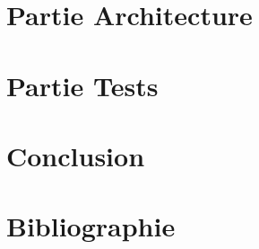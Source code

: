 \documentclass{article}
\begin{document}
\section{Partie Architecture}

\section{Partie Tests}

\section{Conclusion}

\section{Bibliographie}



\end{document}
